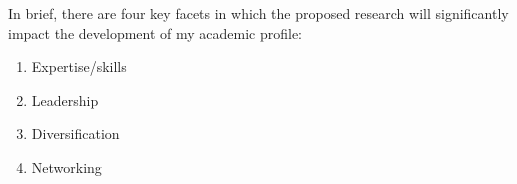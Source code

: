 \documentclass[12pt]{article}
\begin{document}
	In brief, there are four key facets in which the proposed research will significantly impact the development of my academic profile:
	
	\begin{enumerate}
		\item Expertise/skills
		\item Leadership
		\item Diversification
		\item Networking
	\end{enumerate}
		
		

	
	
	  
	
	
	 

  

%	
%	
\end{document}
